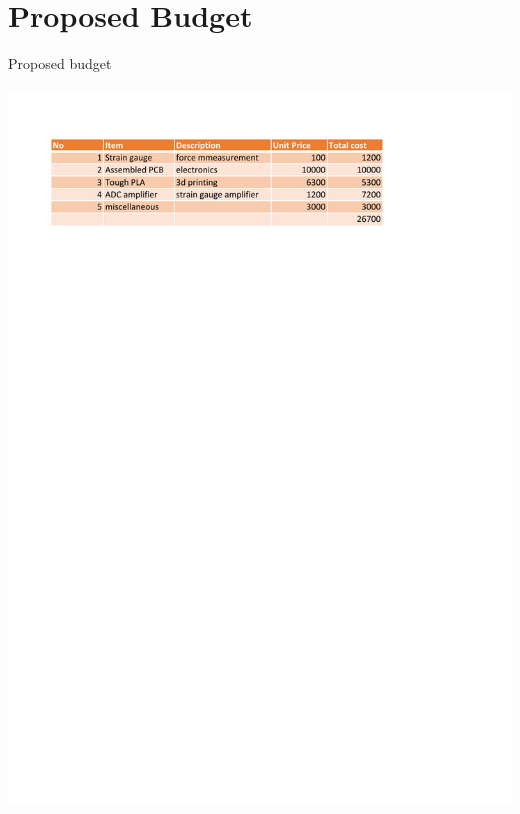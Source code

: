 \section{Proposed Budget}
\begin{center}
\begin{table}[!h]
\centering
\caption{Proposed budget}
\paragraph{ }
\includegraphics{Figures/budget}
\end{table}
\end{center}
